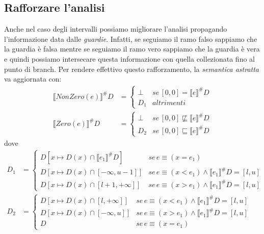 \documentclass[a4paper,oneside,titlepage]{book}
\begin{document}
\subsection{Rafforzare l'analisi}
Anche nel caso degli intervalli possiamo migliorare l'analisi propagando l'informazione data dalle \textit{guardie}. Infatti, se seguiamo il ramo falso sappiamo che la guardia è falsa mentre se seguiamo il ramo vero sappiamo che la guardia è vera e quindi possiamo intersecare questa informazione con quella collezionata fino al punto di branch. Per rendere effettivo questo rafforzamento, la \textit{semantica astratta} va aggiornata con:
\begin{align*}
    \llbracket NonZero(e) \rrbracket^\# D &=
	\begin{cases}
		\bot & se \, [0,0] = \llbracket e \rrbracket^\# D \\
		D_1 & altrimenti
	\end{cases} \\
	\llbracket Zero(e) \rrbracket^\# D &=
	\begin{cases}
	    \bot & se \, [0,0] \not\sqsubseteq \llbracket e \rrbracket^\# D \\
		D_2 & se \, [0,0] \sqsubseteq \llbracket e \rrbracket^\# D
	\end{cases}
\end{align*}
dove
\begin{align*}
    D_1 &=
        \begin{cases}
            D[x \mapsto D(x) \cap \llbracket e_1 \rrbracket^\# D] & se \, e \equiv (x=e_1) \\
            D[x \mapsto D(x) \cap [- \infty, u-1]] & se \, e \equiv (x < e_1) \wedge \llbracket e_1 \rrbracket^\# D = [l,u] \\
            D[x \mapsto D(x) \cap [l+1, + \infty]] & se \, e \equiv (x > e_1) \wedge \llbracket e_1 \rrbracket^\# D = [l,u]
        \end{cases} \\
    D_2 &=
        \begin{cases}
            D[x \mapsto D(x) \cap [l, + \infty]] & se \, e \equiv (x < e_1) \wedge \llbracket e_1 \rrbracket^\# D = [l,u] \\
            D[x \mapsto D(x) \cap [- \infty, u]] & se \, e \equiv (x > e_1) \wedge \llbracket e_1 \rrbracket^\# D = [l,u] \\
            D & se \, e \equiv (x=e_1)
        \end{cases}
\end{align*}
\end{document}
